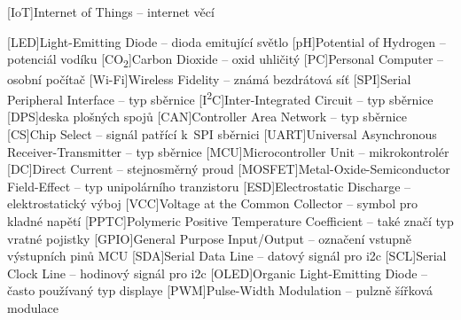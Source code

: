 \cleardoublepage
\chapter*{\listofabbrevname}
{}

\begin{acronym}[iotasdasdsd]

	[IoT]{Internet of Things -- internet věcí}

	[LED]{Light-Emitting Diode -- dioda emitující světlo}
	[pH]{Potential of Hydrogen -- potenciál vodíku}
	[CO\textsubscript{2}]{Carbon Dioxide -- oxid uhličitý}
	[PC]{Personal Computer -- osobní počítač}
	[Wi-Fi]{Wireless Fidelity -- známá bezdrátová síť}
	[SPI]{Serial Peripheral Interface -- typ sběrnice}
	[I\textsuperscript{2}C]{Inter-Integrated Circuit -- typ sběrnice}
	[DPS]{deska plošných spojů}
	[CAN]{Controller Area Network -- typ sběrnice}
	[CS]{Chip Select -- signál patřící k~SPI sběrnici}
	[UART]{Universal Asynchronous Receiver-Transmitter -- typ sběrnice}
	[MCU]{Microcontroller Unit -- mikrokontrolér}
	[DC]{Direct Current -- stejnosměrný proud}
	[MOSFET]{Metal-Oxide-Semiconductor Field-Effect -- typ unipolárního tranzistoru}
	[ESD]{Electrostatic Discharge -- elektrostatický výboj}
	[VCC]{Voltage at the Common Collector -- symbol pro kladné napětí}
	[PPTC]{Polymeric Positive Temperature Coefficient -- také značí typ vratné pojistky}
	[GPIO]{General Purpose Input/Output -- označení vstupně výstupních pinů MCU}
	[SDA]{Serial Data Line -- datový signál pro \acs{i2c}}
	[SCL]{Serial Clock Line -- hodinový signál pro \acs{i2c}}
	[OLED]{Organic Light-Emitting Diode -- často používaný typ displaye}
	[PWM]{Pulse-Width Modulation -- pulzně šířková modulace}

\end{acronym}

